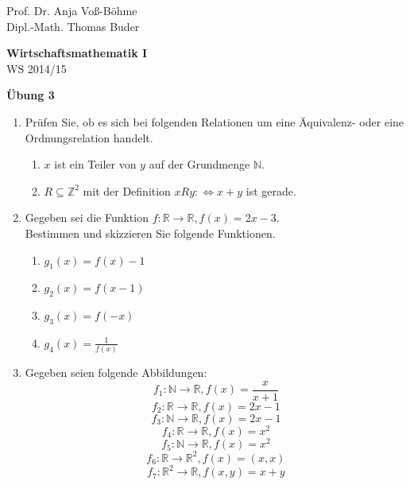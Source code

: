 \documentclass[12pt,a4paper]{scrreprt}
\newcommand{\N}{\mathds{N}}
\newcommand{\Z}{\mathds{Z}}
\newcommand{\R}{\mathds{R}}
\begin{document}
 
\begin{flushleft}
Prof. Dr. Anja Voß-Böhme \\
Dipl.-Math. Thomas Buder
\end{flushleft}

\begin{center}
\large{\textbf{ Wirtschaftsmathematik I}} \\
WS 2014/15 \end{center}

\begin{center}\large{\textbf{ Übung 3 }} \end{center}

\bigskip
\begin{enumerate}
 			
\item Prüfen Sie, ob es sich bei folgenden Relationen um eine Äquivalenz- oder eine Ordnungsrelation handelt.

		\begin{enumerate}
			\item $x$ ist ein Teiler von $y$ auf der Grundmenge $\N$.
			\item $ R\subseteq \Z^2$ mit der Definition $x R y:\Leftrightarrow x+y$ ist gerade.
		\end{enumerate}
		
		
\item Gegeben sei die Funktion $f: \R \to \R, f(x)=2x-3.$ \\
			Bestimmen und skizzieren Sie folgende Funktionen.
 \begin{enumerate}
			\item $g_1(x)=f(x)-1$
			\item $g_2(x)=f(x-1)$
			\item $g_3(x)=f(-x)$
			\item $g_4(x)=\frac{1}{f(x)}$
 \end{enumerate}

 \item Gegeben seien folgende Abbildungen: \\
\[f_1: \N \to \R,   f(x)=\frac{x}{x+1}\]
\[f_2: \R \to \R,   f(x)=2x-1\]
\[f_3: \N \to \R,   f(x)=2x-1\]
\[f_4: \R \to \R,   f(x)=x^2\]
\[f_5: \N \to \R,   f(x)=x^2\]
\[f_6: \R \to \R^2, f(x)=(x,x) \]
\[f_7: \R^2 \to \R, f(x,y) = x+y \] 


\end{enumerate}
\end{document}
